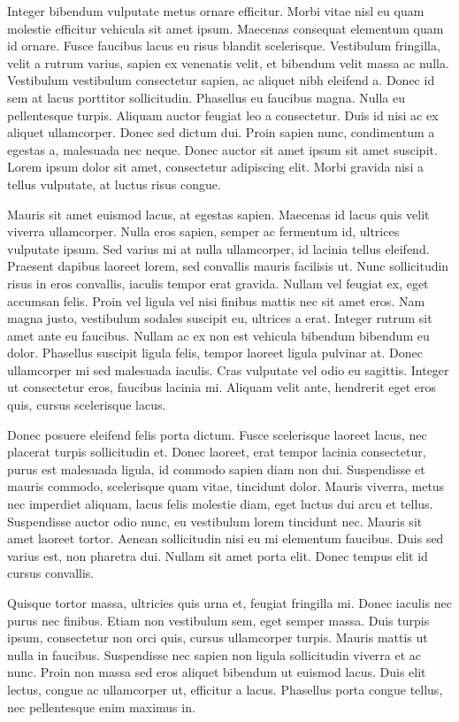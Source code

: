 Integer bibendum vulputate metus ornare efficitur. Morbi vitae nisl eu quam molestie efficitur vehicula sit amet ipsum. Maecenas consequat elementum quam id ornare. Fusce faucibus lacus eu risus blandit scelerisque. Vestibulum fringilla, velit a rutrum varius, sapien ex venenatis velit, et bibendum velit massa ac nulla. Vestibulum vestibulum consectetur sapien, ac aliquet nibh eleifend a. Donec id sem at lacus porttitor sollicitudin. Phasellus eu faucibus magna. Nulla eu pellentesque turpis. Aliquam auctor feugiat leo a consectetur. Duis id nisi ac ex aliquet ullamcorper. Donec sed dictum dui. Proin sapien nunc, condimentum a egestas a, malesuada nec neque. Donec auctor sit amet ipsum sit amet suscipit. Lorem ipsum dolor sit amet, consectetur adipiscing elit. Morbi gravida nisi a tellus vulputate, at luctus risus congue.

Mauris sit amet euismod lacus, at egestas sapien. Maecenas id lacus quis velit viverra ullamcorper. Nulla eros sapien, semper ac fermentum id, ultrices vulputate ipsum. Sed varius mi at nulla ullamcorper, id lacinia tellus eleifend. Praesent dapibus laoreet lorem, sed convallis mauris facilisis ut. Nunc sollicitudin risus in eros convallis, iaculis tempor erat gravida. Nullam vel feugiat ex, eget accumsan felis. Proin vel ligula vel nisi finibus mattis nec sit amet eros. Nam magna justo, vestibulum sodales suscipit eu, ultrices a erat. Integer rutrum sit amet ante eu faucibus. Nullam ac ex non est vehicula bibendum bibendum eu dolor. Phasellus suscipit ligula felis, tempor laoreet ligula pulvinar at. Donec ullamcorper mi sed malesuada iaculis. Cras vulputate vel odio eu sagittis. Integer ut consectetur eros, faucibus lacinia mi. Aliquam velit ante, hendrerit eget eros quis, cursus scelerisque lacus.

Donec posuere eleifend felis porta dictum. Fusce scelerisque laoreet lacus, nec placerat turpis sollicitudin et. Donec laoreet, erat tempor lacinia consectetur, purus est malesuada ligula, id commodo sapien diam non dui. Suspendisse et mauris commodo, scelerisque quam vitae, tincidunt dolor. Mauris viverra, metus nec imperdiet aliquam, lacus felis molestie diam, eget luctus dui arcu et tellus. Suspendisse auctor odio nunc, eu vestibulum lorem tincidunt nec. Mauris sit amet laoreet tortor. Aenean sollicitudin nisi eu mi elementum faucibus. Duis sed varius est, non pharetra dui. Nullam sit amet porta elit. Donec tempus elit id cursus convallis.

Quisque tortor massa, ultricies quis urna et, feugiat fringilla mi. Donec iaculis nec purus nec finibus. Etiam non vestibulum sem, eget semper massa. Duis turpis ipsum, consectetur non orci quis, cursus ullamcorper turpis. Mauris mattis ut nulla in faucibus. Suspendisse nec sapien non ligula sollicitudin viverra et ac nunc. Proin non massa sed eros aliquet bibendum ut euismod lacus. Duis elit lectus, congue ac ullamcorper ut, efficitur a lacus. Phasellus porta congue tellus, nec pellentesque enim maximus in.

